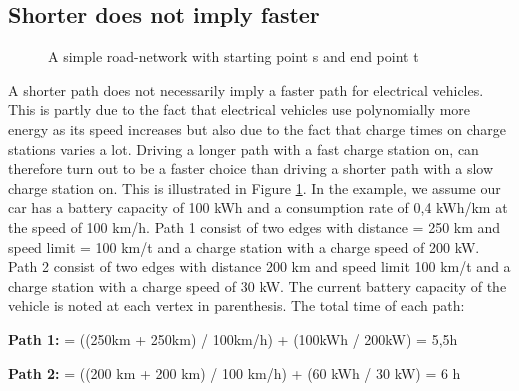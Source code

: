\subsection{Shorter does not imply faster}

\begin{figure}
\label{fig:simpleroad-network}
\caption{A simple road-network with starting point s and end point t}
\end{figure}

A shorter path does not necessarily imply a faster path for electrical vehicles. This is partly due to the fact that electrical vehicles use polynomially more energy as its speed increases but also due to the fact that charge times on charge stations varies a lot. 
Driving a longer path with a fast charge station on, can therefore turn out to be a faster choice than driving a shorter path with a slow charge station on. This is illustrated in Figure \ref{fig:simpleroad-network}. In the example, we assume our car has a battery capacity of 100 kWh and a consumption rate of 0,4 kWh/km at the speed of 100 km/h. Path 1 consist of two edges with distance = 250 km and speed limit = 100 km/t
and a charge station with a charge speed of 200 kW. Path 2 consist of two edges with
distance 200 km and speed limit 100 km/t and a charge station with a charge speed of 30 kW. The current battery capacity of the vehicle is noted at each vertex in parenthesis. The total time of each path:
				
\textbf{Path 1:}  = ((250km + 250km) / 100km/h) + (100kWh / 200kW) = 5,5h
				
\textbf{Path 2:}  = ((200 km + 200 km) / 100 km/h) + (60 kWh / 30 kW) = 6 h

